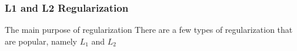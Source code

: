 \subsubsection{L1 and L2 Regularization}

The main purpose of regularization There are a few types of regularization that are popular, namely $L_1$ and $L_2$